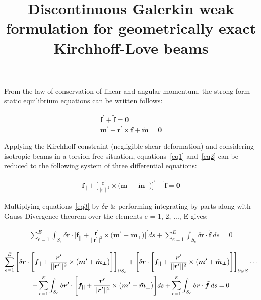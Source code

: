\documentclass[12pt,twoside]{article}
\title{{\textbf{Discontinuous Galerkin weak formulation for geometrically exact Kirchhoff-Love beams}}}
\author{}
\date{}
\begin{document}
\maketitle

\noindent
From the law of conservation of linear and angular momentum, the strong form static equilibrium equations can be written follows:

\begin{gather}
  \boldsymbol{f^{\prime}} + \boldsymbol{\tilde{f}} = \boldsymbol{0}\label{eq1} \\
  \boldsymbol{m^{\prime}} + \boldsymbol{r^{\prime}} \times \boldsymbol{f} + \boldsymbol{\tilde{m}} = \boldsymbol{0}\label{eq2}
\end{gather}

\noindent
Applying the Kirchhoff constraint (negligible shear deformation) and considering isotropic beams in a torsion-free situation, equations~\ref{eq1} and~\ref{eq2} can be reduced to the following system of three differential equations:

\begin{gather}
  \boldsymbol{f^{\prime}_{||}} + \Bigg[\frac{\boldsymbol{r^{\prime}}}{||\boldsymbol{r^{\prime}}||^{2}} \times \big(\boldsymbol{m^{\prime}} + \boldsymbol{\tilde{m}_{\perp}}\big)\Bigg]^{\prime} + \boldsymbol{\tilde{f}} = \boldsymbol{0}\label{eq3}
\end{gather}

\noindent
Multiplying equations~\ref{eq3} by $\delta\boldsymbol{r}$ \& performing integrating by parts along with Gauss-Divergence theorem over the elements e = 1, 2, ..., E gives:

\begin{gather}
  \sum_{e=1}^{E} \int_{S_{e}} \delta\boldsymbol{r} \cdot \Bigg[\boldsymbol{f_{||}} + \frac{\boldsymbol{r^{\prime}}}{||\boldsymbol{r^{\prime}}||^{2}} \times \big(\boldsymbol{m^{\prime}} + \boldsymbol{\tilde{m}_{\perp}}\big)\Bigg]^{\prime}ds + \sum_{e=1}^{E} \int_{S_{e}} \delta\boldsymbol{r} \cdot \boldsymbol{\tilde{f}}\:ds = 0
\end{gather}

\begin{gather}
  \sum_{e=1}^{E} \Bigg[\delta\boldsymbol{r} \cdot \Bigg[\boldsymbol{f_{||}} + \frac{\boldsymbol{r^{\prime}}}{||\boldsymbol{r^{\prime}}||^{2}} \times \big(\boldsymbol{m^{\prime}} + \boldsymbol{\tilde{m}_{\perp}}\big)\Bigg]\Bigg]_{\partial S_{e}} + \Bigg[\delta\boldsymbol{r} \cdot \Bigg[\boldsymbol{f_{||}} + \frac{\boldsymbol{r^{\prime}}}{||\boldsymbol{r^{\prime}}||^{2}} \times \big(\boldsymbol{m^{\prime}} + \boldsymbol{\tilde{m}_{\perp}}\big)\Bigg]\Bigg]_{\partial_{N} S} \cdots \notag \\
  - \sum_{e=1}^{E} \int_{S_{e}} \delta\boldsymbol{r^{\prime}} \cdot \Bigg[\boldsymbol{f_{||}} + \frac{\boldsymbol{r^{\prime}}}{||\boldsymbol{r^{\prime}}||^{2}} \times \big(\boldsymbol{m^{\prime}} + \boldsymbol{\tilde{m}_{\perp}}\big)\Bigg]ds + \sum_{e=1}^{E} \int_{S_{e}} \delta\boldsymbol{r} \cdot \boldsymbol{\tilde{f}}\:ds = 0
\end{gather}
\end{document}
